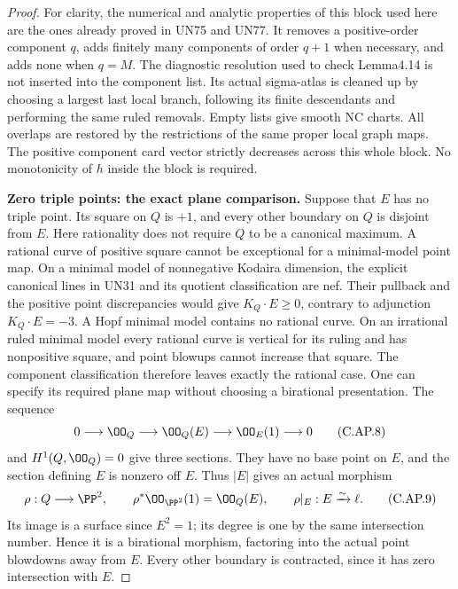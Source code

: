 \begin{proof}
For clarity, the numerical and analytic properties of this
block used here are the ones already proved in UN75 and
UN77. It removes a positive-order component \(q\), adds
finitely many components of order \(q+1\) when necessary,
and adds none when \(q=M\). The diagnostic resolution used
to check Lemma4.14 is not inserted into the component list.
Its actual sigma-atlas is cleaned up by choosing a largest
last local branch, following its finite descendants and
performing the same ruled removals. Empty lists give smooth
NC charts. All overlaps are restored by the restrictions of
the same proper local graph maps. The positive component
card vector strictly decreases across this whole block.
No monotonicity of \(h\) inside the block is required.

\par\medskip\noindent\textbf{Zero triple points: the exact plane comparison.}
Suppose that \(E\) has no triple point. Its square on \(Q\)
is \(+1\), and every other boundary on \(Q\) is disjoint
from \(E\). Here rationality does not require \(Q\) to be
a canonical maximum. A rational curve of positive square
cannot be exceptional for a minimal-model point map. On a
minimal model of nonnegative Kodaira dimension, the explicit
canonical lines in UN31 and its quotient classification are
nef. Their pullback and the positive point discrepancies
would give \(K_Q\cdot E\ge0\), contrary to adjunction
\(K_Q\cdot E=-3\). A Hopf minimal model contains no rational
curve. On an irrational ruled minimal model every rational
curve is vertical for its ruling and has nonpositive square,
and point blowups cannot increase that square. The component
classification therefore leaves exactly the rational case.
One can specify its required plane
map without choosing a birational presentation. The sequence
\[
 0\longrightarrow\OO_Q\longrightarrow\OO_Q(E)
       \longrightarrow\OO_E(1)\longrightarrow0
 \tag{C.AP.8}
\]
and \(H^1(Q,\OO_Q)=0\) give three sections. They have no base
point on \(E\), and the section defining \(E\) is nonzero
off \(E\). Thus \(|E|\) gives an actual morphism
\[
 \rho:Q\longrightarrow\PP^2,
 \qquad \rho^*\OO_{\PP^2}(1)=\OO_Q(E),
 \qquad \rho|_E:E\xrightarrow{\sim}\ell .
 \tag{C.AP.9}
\]
Its image is a surface since \(E^2=1\); its degree is one
by the same intersection number. Hence it is a birational
morphism, factoring into the actual point blowdowns away
from \(E\). Every other boundary is contracted, since it
has zero intersection with \(E\).


\end{proof}
